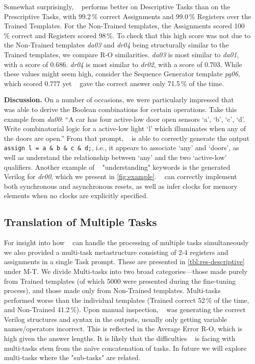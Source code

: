 Somewhat surprisingly, \sol~ performs better on Descriptive Tasks than on the Prescriptive Tasks, with 99.2\,\% correct Assignments and 99.0\,\% Registers over the Trained Templates.
For the Non-Trained templates, the Assignments scored 100\,\% correct and Registers scored 98\,\%.
To check that this high score was not due to the Non-Trained templates \textit{da03} and \textit{dr04} being structurally similar to the Trained templates, we compare R-O similarities. \textit{da03} is most similar to \textit{da01}, with a score of $0.686$. \textit{dr04} is most similar to \textit{dr02}, with a score of $0.703$. 
While these values might seem high, consider the  Sequence Generator template \textit{pg06}, which scored $0.777$ yet \sol~ gave the correct answer only 71.5\,\% of the time.

\textbf{Discussion.} 
On a number of occasions, we were particularly impressed that \sol~ was able to derive the Boolean combinations for certain operations.
Take this example from \textit{da00}: ``A car has four active-low door open sensors `a', `b', `c', `d'. Write combinatorial logic for a active-low light `l' which illuminates when any of the doors are open.''
From that prompt, \sol~ is able to correctly generate the output \texttt{assign l = a \& b \& c \& d;}, i.e., it appears to associate `any' and `doors', as well as understand the relationship between `any' and the two `active-low' qualifiers.
Another example of \sol~ "understanding" keywords is the generated Verilog for \textit{dr00}, which we present in \autoref{fig:example}. %
\sol~ can correctly implement both synchronous and asynchronous resets, as well as infer clocks for memory elements when no clocks are explicitly specified.

\subsection{Translation of Multiple Tasks}
\label{sec:results-multi-tasks}

For insight into how \sol~ can handle the processing of multiple tasks simultaneously we also provided a multi-task metastructure consisting of 2-4 registers and assignments in a single Task prompt.
These are presented in \autoref{tbl:res-descriptive} under M-T.
We divide Multi-tasks into two broad categories---those made purely from Trained templates (of which 5000 were presented during the fine-tuning process), and those made only from Non-Trained templates.
Multi-tasks performed worse than the individual templates (Trained correct 52\,\% of the time, and Non-Trained 41.2\,\%).
Upon manual inspection, \sol~ was generating the correct Verilog structures and syntax in the outputs, usually only getting variable names/operators incorrect. This is reflected in the Average Error R-O, which is high given the answer lengths. It is likely that the difficulties \sol~ is facing with multi-tasks stem from the na\"{i}ve concatenation of tasks. In future we will explore multi-tasks where the "sub-tasks" are related. 

